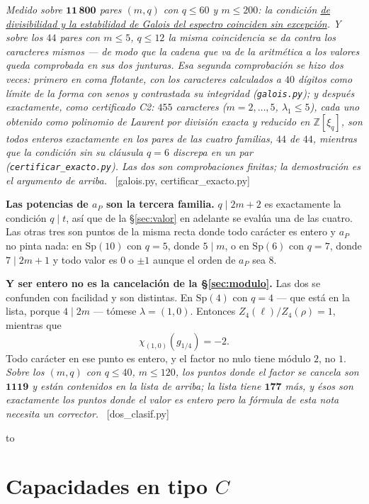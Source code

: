 \documentclass[11pt,a4paper]{article}
\newcommand{\Sp}{\mathrm{Sp}}
\newcommand{\ver}[1]{\unskip\penalty0\ \textcolor{azul}{\small\textsf{[#1]}}}
\newenvironment{keybox}
  {\par\vspace{9pt}\begin{lrbox}{\fichabox}%
   \begin{minipage}{0.90\textwidth}\vspace{7pt}\setlength{\parskip}{3pt}}
  {\vspace{7pt}\end{minipage}\end{lrbox}%
   \par\noindent\hbox to \textwidth{\hfill
   \textcolor{azul}{\rule[-\dp\fichabox]{3.2pt}{\dimexpr\ht\fichabox+\dp\fichabox\relax}}%
   \colorbox{fondoficha}{\usebox{\fichabox}}\hfill}%
   \par\vspace{9pt}}
\begin{document}
\noindent \emph{Medido sobre $\mathbf{11\,800}$ pares $(m,q)$ con $q\le60$ y $m\le200$: la condición
\href{https://karlesmarin.github.io/blueprints/characters-at-aP/index.html?lab=thm\%3Aclasif\#thm:clasif}{de divisibilidad y la estabilidad de Galois del espectro coinciden sin excepción}. Y sobre los $44$
pares con $m\le5$, $q\le12$ la misma coincidencia se da contra los caracteres mismos --- de modo
que la cadena que va de la aritmética a los valores queda comprobada en sus dos junturas. Esa
segunda comprobación se hizo dos veces: primero en coma flotante, con los caracteres calculados a
$40$ dígitos como límite de la forma con senos y contrastada su integridad
\textup{(}\texttt{galois.py}\textup{)}; y después exactamente, como certificado C2: $455$ caracteres
($m=2,\dots,5$, $\lambda_1\le5$), cada uno obtenido como polinomio de Laurent por división exacta y
reducido en $\mathbb{Z}[\xi_q]$, son todos enteros exactamente en los pares de las cuatro familias,
$44$ de $44$, mientras que la condición sin su cláusula $q=6$ discrepa en un par
\textup{(}\texttt{certificar\_exacto.py}\textup{)}. Las dos son comprobaciones finitas; la
demostración es el argumento de arriba.} \ver{galois.py, certificar\_exacto.py}

\begin{keybox}
\textbf{Las potencias de $a_P$ son la tercera familia.} $q\mid 2m+2$ es exactamente la condición
$q\mid t$, así que de la \S\ref{sec:valor} en adelante se evalúa una de las cuatro. Las otras tres
son puntos de la misma recta donde todo carácter es entero y $a_P$ no pinta nada: en $\Sp(10)$ con
$q=5$, donde $5\mid m$, o en $\Sp(6)$ con $q=7$, donde $7\mid 2m+1$ y todo valor es $0$ o $\pm1$
aunque el orden de $a_P$ sea $8$.

\smallskip
\textbf{Y ser entero no es la cancelación de la \S\ref{sec:modulo}.} Las dos se confunden con
facilidad y son distintas. En $\Sp(4)$ con $q=4$ --- que está en la lista, porque $4\mid 2m$ ---
tómese $\lambda=(1,0)$. Entonces $Z_4(\ell)/Z_4(\rho)=1$, mientras que
\[
\chi_{(1,0)}(g_{1/4})=-2 .
\]
Todo carácter en ese punto es entero, y el factor no nulo tiene módulo $2$, no $1$. \emph{Sobre los
$(m,q)$ con $q\le40$, $m\le120$, los puntos donde el factor se cancela son $\mathbf{1119}$ y están
contenidos en la lista de arriba; la lista tiene $\mathbf{177}$ más, y ésos son exactamente los
puntos donde el valor es entero pero la fórmula de esta nota necesita un corrector.}
\ver{dos\_clasif.py}
\end{keybox}

\section{Capacidades en tipo $C$}\label{sec:cap}
\end{document}
